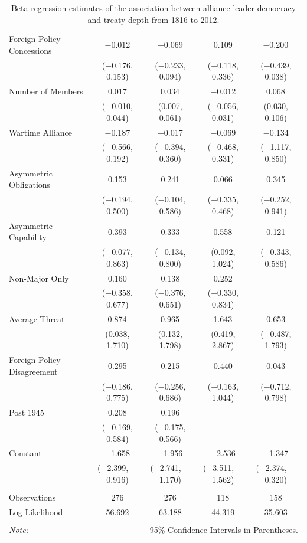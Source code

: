 \documentclass[12pt]{article}
\begin{document}
\begin{table}[!htbp]
{\begin{tabular}{@{\extracolsep{5pt}}lcccc}
  Foreign Policy Concessions & $-$0.012 & $-$0.069 & 0.109 & $-$0.200$^{}$ \\ 
  & ($-$0.176, 0.153) & ($-$0.233, 0.094) & ($-$0.118, 0.336) & ($-$0.439, 0.038) \\ 
  Number of Members & 0.017 & 0.034$^{}$ & $-$0.012 & 0.068$^{}$ \\ 
  & ($-$0.010, 0.044) & (0.007, 0.061) & ($-$0.056, 0.031) & (0.030, 0.106) \\ 
  Wartime Alliance & $-$0.187 & $-$0.017 & $-$0.069 & $-$0.134 \\ 
  & ($-$0.566, 0.192) & ($-$0.394, 0.360) & ($-$0.468, 0.331) & ($-$1.117, 0.850) \\ 
  Asymmetric Obligations & 0.153 & 0.241 & 0.066 & 0.345 \\ 
  & ($-$0.194, 0.500) & ($-$0.104, 0.586) & ($-$0.335, 0.468) & ($-$0.252, 0.941) \\ 
  Asymmetric Capability & 0.393 & 0.333 & 0.558$^{}$ & 0.121 \\ 
  & ($-$0.077, 0.863) & ($-$0.134, 0.800) & (0.092, 1.024) & ($-$0.343, 0.586) \\ 
  Non-Major Only & 0.160 & 0.138 & 0.252 &  \\ 
  & ($-$0.358, 0.677) & ($-$0.376, 0.651) & ($-$0.330, 0.834) &  \\ 
  Average Threat & 0.874$^{}$ & 0.965$^{}$ & 1.643$^{}$ & 0.653 \\ 
  & (0.038, 1.710) & (0.132, 1.798) & (0.419, 2.867) & ($-$0.487, 1.793) \\ 
  Foreign Policy Disagreement & 0.295 & 0.215 & 0.440 & 0.043 \\ 
  & ($-$0.186, 0.775) & ($-$0.256, 0.686) & ($-$0.163, 1.044) & ($-$0.712, 0.798) \\ 
  Post 1945 & 0.208 & 0.196 &  &  \\ 
  & ($-$0.169, 0.584) & ($-$0.175, 0.566) &  &  \\ 
  Constant & $-$1.658$^{}$ & $-$1.956$^{}$ & $-$2.536$^{}$ & $-$1.347$^{}$ \\ 
  & ($-$2.399, $-$0.916) & ($-$2.741, $-$1.170) & ($-$3.511, $-$1.562) & ($-$2.374, $-$0.320) \\ 
 \hline \\[-1.8ex] 
Observations & 276 & 276 & 118 & 158 \\ 
Log Likelihood & 56.692 & 63.188 & 44.319 & 35.603 \\ 
\hline 
\hline \\[-1.8ex] 
\textit{Note:}  & \multicolumn{4}{r}{95\% Confidence Intervals in Parentheses.} \\ 
\end{tabular} 
}
  \caption{Beta regression estimates of the association between alliance leader democracy and treaty depth from 1816 to 2012.} 
  \label{tab:reg-est} 
\end{table} 
\end{document}

